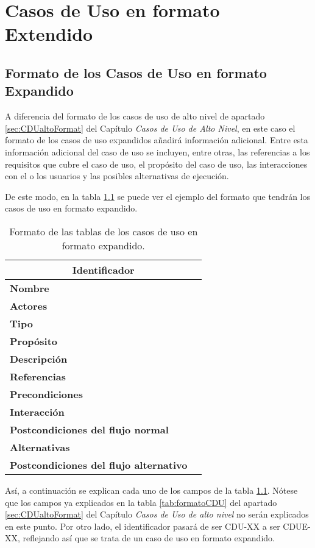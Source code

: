 \chapter{Casos de Uso en formato Extendido}
\section{Formato de los Casos de Uso en formato Expandido}
\par A diferencia del formato de los casos de uso de alto nivel de apartado \ref{sec:CDUaltoFormat} del Capítulo \textit{Casos de Uso de Alto Nivel}, en este caso el formato de los casos de uso expandidos añadirá información adicional. Entre esta información adicional del caso de uso se incluyen, entre otras, las referencias a los requisitos que cubre el caso de uso, el propósito del caso de uso, las interacciones con el o los usuarios y las posibles alternativas de ejecución.
\par De este modo, en la tabla \ref{tab:formatoCDUE} se puede ver el ejemplo del formato que tendrán los casos de uso en formato expandido.

\begin{table}[h]
\begin{center}
\begin{tabular}{p{} p{11cm}}
\multicolumn{2}{c}{\textbf{Identificador} } \\ \hline \hline
\textbf{Nombre} &  \\ \hline
\textbf{Actores} &  \\ \hline
\textbf{Tipo} & \\ \hline
\textbf{Propósito} &  \\ \hline
\textbf{Descripción} &  \\ \hline
\textbf{Referencias} &  \\ \hline
\textbf{Precondiciones} &  \\ \hline
\textbf{Interacción} &  \\ \hline
\textbf{Postcondiciones del flujo normal} &  \\ \hline
\textbf{Alternativas} &  \\ \hline
\textbf{Postcondiciones del flujo alternativo} &  \\ \hline
\end{tabular}
\caption{Formato de las tablas de los casos de uso en formato expandido.}
\label{tab:formatoCDUE}
\end{center}
\end{table}

\par Así, a continuación se explican cada uno de los campos de la tabla \ref{tab:formatoCDUE}. Nótese que los campos ya explicados en la tabla \ref{tab:formatoCDU} del apartado \ref{sec:CDUaltoFormat} del Capítulo \textit{Casos de Uso de alto nivel} no serán explicados en este punto. Por otro lado, el identificador pasará de ser CDU-XX a ser CDUE-XX, reflejando así que se trata de un caso de uso en formato expandido.

